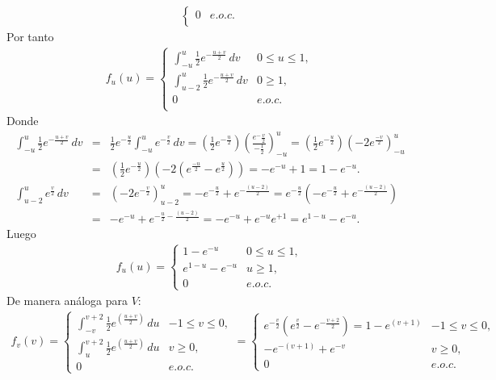 \begin {Ejem}
\begin{eqnarray*}
\begin{cases}
0 & e.o.c.\\
\end{cases}
\end{eqnarray*}
Por tanto
\begin{eqnarray*} 
f_{u}\left(u \right) = \begin{cases}
\int_{-u}^{u}\frac{1}{2}e^{- \frac{u+v}{2} }\,dv & 0 \leq u \leq 1, \\
\int_{u-2}^{u}\frac{1}{2}e^{- \frac{u+v}{2} }\,dv & 0 \geq 1,  \\
0 & e.o.c.\\
\end{cases}
\end{eqnarray*}
Donde
\begin{eqnarray*} 
\int _{-u}^{u}\frac{1}{2}e^{- \frac{u+v}{2} }\,dv &=&\frac{1}{2}e^{- \frac{u}{2} } \int _{-u}^{u} e^{- \frac{v}{2} } \,dv= \left( \frac{1}{2} e^{-\frac{u}{2} } \right)\left(\frac{ e^-{\frac{v}{2} } }{-\frac{1}{2}}\right)_{-u}^{u}=
 \left( \frac{1}{2} e^{-\frac{u}{2} } \right)\left(-2 e^{\frac{-v}{2}}\right)_{-u}^{u}\\
 &=& \left( \frac{1}{2} e^{-\frac{u}{2} } \right)\left(-2 \left(e^{\frac{-u}{2}}- e^{\frac{u}{2}}\right)\right)= -e^{-u}+1=1-e^{-u}.\\
 \int_{u-2}^{u} e^{\frac{v}{2} }\,dv &=& \left(-2e^{-\frac{v}{2} } \right)_{u-2}^{u}=-e^{-\frac{u}{2}}+ e^{-\frac{\left( u-2\right)}{2}}= e^{-\frac{u}{2}}\left(-e^{-\frac{u}{2}}+ e^{-\frac{\left( u-2\right)}{2}} \right)\\
 &=& -e^{-u}+e^{-\frac{u}{2} -\frac{\left( u-2\right)}{2}}=-e^{-u}+e^{-u}e^{+1} = e^{1-u}-e^{-u}.
\end{eqnarray*}
Luego
\begin{eqnarray*} 
f_{u} \left(u \right) = \begin{cases}
1-e^{-u} & 0 \leq u \leq 1, \\
e^{1-u}-e^{-u} & u\geq1,  \\
0 & e.o.c.
\end{cases}
\end{eqnarray*}
De manera an\'aloga para $V$:
\begin{eqnarray*} 
f_{v} \left( v \right) = \begin{cases}
\int_{-v}^{v+2} \frac{1}{2}e^{\left(\frac{u+v}{2}\right)}\,du & -1\leq v \leq 0,\\
\int_{u}^{v+2} \frac{1}{2}e^{\left(\frac{u+v}{2}\right)}\,du & v \geq 0,\\
0 & e.o.c.
\end{cases}
= \begin{cases}
e^{-\frac{v}{2}}\left(e^{\frac{v}{2}}-e^{- \frac{v+2}{2} } \right)= 1-e^{\left(v+1 \right) }  & -1\leq v \leq 0,\\
-e^{-\left(v+1 \right)}+e^{-v} & v \geq 0,\\
0 & e.o.c.
\end{cases} 
\end{eqnarray*}
\end{Ejem}

